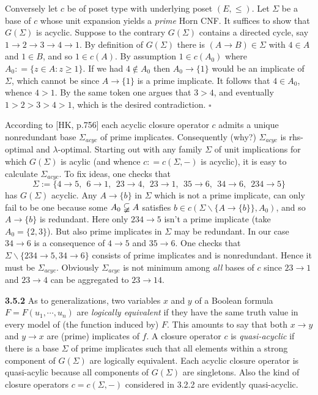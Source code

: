 \documentclass[11pt]{article}
\newcommand{\ra}{\rightarrow}
\begin{document}
Conversely let $c$ be of poset type with underlying poset $(E, \leq)$. Let $\Sigma$ be a base of $c$ whose unit expansion yields a {\it prime} Horn CNF. It suffices to show that $G(\Sigma)$ is acyclic. Suppose to the contrary $G(\Sigma)$ contains a directed cycle, say $1 \ra 2 \ra 3 \ra 4 \ra 1$. By definition of $G(\Sigma)$ there is $(A \ra B) \in \Sigma$ with $4 \in A$ and $1 \in B$, and so $1 \in c(A)$. By assumption $1 \in c(A_0)$ where $A_0 : = \{z \in A:  z \geq 1\}$. If we had $4 \not\in A_0$ then $A_0 \ra \{1\}$ would be an implicate of $\Sigma$, which cannot be since $A \ra \{1\}$ is a prime implicate. It follows that $4 \in A_0$, whence $4 > 1$. By the same token one argues that $3 > 4$, and eventually $1 > 2 > 3 > 4 > 1$, which is the desired contradiction. 
\hfill
\hfill $\square$

According to [HK, p.756] each acyclic closure operator $c$ admits a unique nonredundant base $\Sigma_{acyc}$ of prime implicates. Consequently (why?) $\Sigma_{acyc}$ is rhs-optimal and $\lambda$-optimal. Starting out with any family $\Sigma$ of unit implications for which $G(\Sigma)$ is acylic (and whence $c : = c(\Sigma, -)$ is acyclic), it is easy to calculate $\Sigma_{acyc}$.
To fix ideas, one checks that
$$\Sigma:= \{4 \ra 5, \ \ 6 \ra 1, \ \  23 \ra 4, \ \ 23 \ra 1, \ \ 35 \ra 6, \ \ 34 \ra 6, \ \ 234 \ra 5\}$$
has $G(\Sigma)$ acyclic. Any $A \ra \{b\}$ in $\Sigma$ which is not a prime implicate, can only fail to be one because some $A_0 \varsubsetneqq A$ satisfies $b \in c(\Sigma \backslash \{A \ra \{b\}\}, A_0)$, and so $A \ra \{b\}$ is redundant. Here only $234 \ra 5$ isn't a prime implicate (take $A_0 = \{2,3\}$). But also prime implicates in $\Sigma$ may be redundant. In our case $34 \ra 6$ is a consequence of $4 \ra 5$ and $35 \ra 6$. One checks that $\Sigma \backslash \{234 \ra 5, 34 \ra 6\}$ consists of prime implicates and is nonredundant. Hence it must be $\Sigma_{acyc}$. Obviously $\Sigma_{acyc}$ is not minimum among {\it all} bases of $c$ since $23 \ra 1$ and $23 \ra 4$ can be aggregated to $23 \ra 14$.

{\bf 3.5.2} As to generalizations, two variables $x$ and $y$ of a Boolean formula $F = F(u_1, \cdots, u_n)$ are {\it logically equivalent} if they have the same truth value in every model of (the function induced by) $F$. This amounts to say that both $x\ra y$ and $y \ra x$ are (prime) implicates of $f$. A closure operator $c$ is {\it quasi-acyclic} if there is a base $\Sigma$ of prime implicates such that all elements within a strong component of $G(\Sigma)$ are logically equivalent. Each acyclic closure operator is quasi-acylic because all components of $G(\Sigma)$ are singletons. Also the kind of closure operators $c = c(\Sigma, -)$ considered in 3.2.2 are evidently quasi-acyclic.
\end{document}
